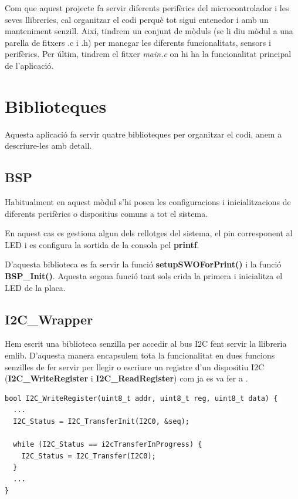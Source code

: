 Com que aquest projecte fa servir diferents perifèrics del microcontrolador i les seves llibreries, cal organitzar el codi perquè tot sigui entenedor i amb un manteniment senzill. Així, tindrem un conjunt de mòduls (se li diu mòdul a una parella de fitxers .c i .h) per manegar les diferents funcionalitats, sensors i perifèrics. Per últim, tindrem el fitxer {\em main.c} on hi ha la funcionalitat principal de l'aplicació.

\section{Biblioteques}
Aquesta aplicació fa servir quatre biblioteques per organitzar el codi, anem a descriure-les amb detall.

\subsection{BSP}
Habitualment en aquest mòdul s'hi posen les configuracions i inicialitzacions de diferents perifèrics o dispositius comuns a tot el sistema.

En aquest cas es gestiona algun dels rellotges del sistema, el pin corresponent al LED i es configura la sortida de la consola pel {\bf printf}.

D'aquesta biblioteca es fa servir la funció {\bf setupSWOForPrint()} i la funció {\bf BSP\_Init()}. Aquesta segona funció tant sols crida la primera i inicialitza el LED de la placa.

\subsection{I2C\_Wrapper}

Hem escrit una biblioteca senzilla per accedir al bus \gls{I2C} fent servir la llibreria emlib. D'aquesta manera encapsulem tota la funcionalitat en dues funcions senzilles de fer servir per llegir o escriure un registre d'un dispositiu I2C ({\bf I2C\_WriteRegister} i {\bf I2C\_ReadRegister}) com ja es va fer a .

\begin{lstlisting}[style=customc, caption={Part de la funció {\bf I2C\_WriteRegister}}, label=I2CWriteRegister]
bool I2C_WriteRegister(uint8_t addr, uint8_t reg, uint8_t data) {
  ...
  I2C_Status = I2C_TransferInit(I2C0, &seq);

  while (I2C_Status == i2cTransferInProgress) {
    I2C_Status = I2C_Transfer(I2C0);
  }
  ...
}
\end{lstlisting}


